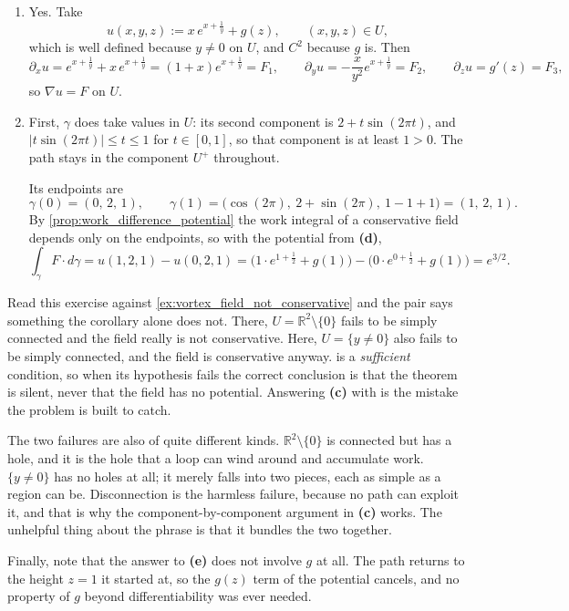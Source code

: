 \begin{exercisesolution}
\begin{enumerate}[label=\textbf{(\alph*)}]
  \item Yes. Take
    \[u(x,y,z) := x\,e^{x+\frac1y} + g(z), \qquad (x,y,z) \in U,\]
    which is well defined because $y \neq 0$ on $U$, and $C^2$ because $g$ is. Then
    \[\partial_x u = e^{x+\frac1y} + x\,e^{x+\frac1y} = (1+x)e^{x+\frac1y} = F_1, \qquad
      \partial_y u = -\frac{x}{y^2}e^{x+\frac1y} = F_2, \qquad
      \partial_z u = g'(z) = F_3,\]
    so $\nabla u = F$ on $U$.

  \item First, $\gamma$ does take values in $U$: its second component is
    $2 + t\sin(2\pi t)$, and $\lvert t\sin(2\pi t)\rvert \le t \le 1$ for $t \in [0,1]$, so that
    component is at least $1 > 0$. The path stays in the component $U^+$ throughout.

    Its endpoints are
    \[\gamma(0) = (0,\,2,\,1), \qquad \gamma(1) = \big(\cos(2\pi),\ 2+\sin(2\pi),\ 1-1+1\big)
      = (1,\,2,\,1).\]
    By \cref{prop:work_difference_potential} the work integral of a conservative field depends only
    on the endpoints, so with the potential from \textbf{(d)},
    \[\int_\gamma F\cdot d\gamma = u(1,2,1) - u(0,2,1)
      = \Big(1\cdot e^{1+\frac12} + g(1)\Big) - \Big(0\cdot e^{0+\frac12} + g(1)\Big)
      = e^{3/2}.\]
\end{enumerate}
\begin{remark}
Read this exercise against \cref{ex:vortex_field_not_conservative} and the pair says something the
corollary alone does not. There, $U = \mathbb{R}^2\setminus\{0\}$ fails to be simply connected and
the field really is not conservative. Here, $U = \{y\neq0\}$ also fails to be simply connected, and
the field is conservative anyway.  is a
\emph{sufficient} condition, so when its hypothesis fails the correct conclusion is that the
theorem is silent, never that the field has no potential. Answering \textbf{(c)} with  is the mistake the problem is built to catch.

The two failures are also of quite different kinds. $\mathbb{R}^2\setminus\{0\}$ is connected but
has a hole, and it is the hole that a loop can wind around and accumulate work. $\{y\neq0\}$ has no
holes at all; it merely falls into two pieces, each as simple as a region can be. Disconnection is
the harmless failure, because no path can exploit it, and that is why the component-by-component
argument in \textbf{(c)} works. The unhelpful thing about the phrase  is that
it bundles the two together.

Finally, note that the answer to \textbf{(e)} does not involve $g$ at all. The path returns to the
height $z = 1$ it started at, so the $g(z)$ term of the potential cancels, and no property of $g$
beyond differentiability was ever needed.
\end{remark}
\end{exercisesolution}

